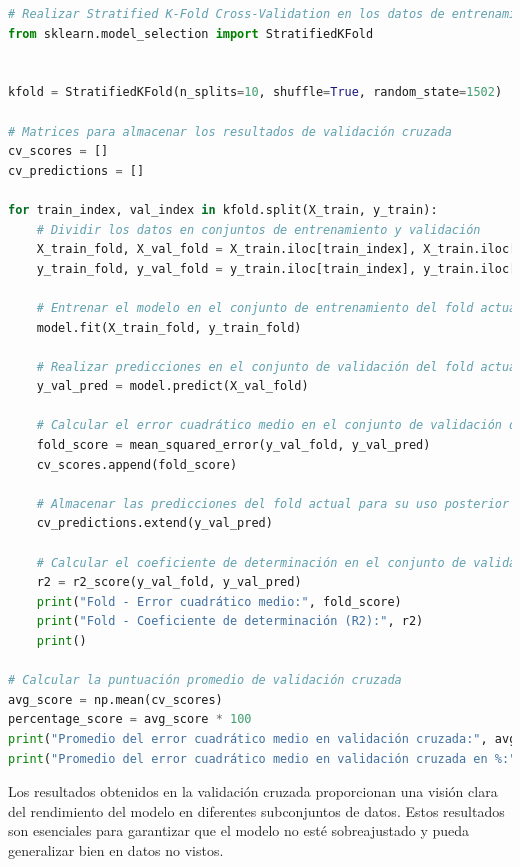 \begin{lstlisting}[language=Python, caption=Realizar Stratified K-Fold Cross-Validation en los datos de entrenamiento, label=lst:skfold_train]
# Realizar Stratified K-Fold Cross-Validation en los datos de entrenamiento
from sklearn.model_selection import StratifiedKFold


kfold = StratifiedKFold(n_splits=10, shuffle=True, random_state=1502)

# Matrices para almacenar los resultados de validación cruzada
cv_scores = []
cv_predictions = []

for train_index, val_index in kfold.split(X_train, y_train):
    # Dividir los datos en conjuntos de entrenamiento y validación
    X_train_fold, X_val_fold = X_train.iloc[train_index], X_train.iloc[val_index]
    y_train_fold, y_val_fold = y_train.iloc[train_index], y_train.iloc[val_index]
    
    # Entrenar el modelo en el conjunto de entrenamiento del fold actual
    model.fit(X_train_fold, y_train_fold)

    # Realizar predicciones en el conjunto de validación del fold actual
    y_val_pred = model.predict(X_val_fold)

    # Calcular el error cuadrático medio en el conjunto de validación del fold actual
    fold_score = mean_squared_error(y_val_fold, y_val_pred)
    cv_scores.append(fold_score)

    # Almacenar las predicciones del fold actual para su uso posterior
    cv_predictions.extend(y_val_pred)

    # Calcular el coeficiente de determinación en el conjunto de validación del fold actual
    r2 = r2_score(y_val_fold, y_val_pred)
    print("Fold - Error cuadrático medio:", fold_score)
    print("Fold - Coeficiente de determinación (R2):", r2)
    print()

# Calcular la puntuación promedio de validación cruzada
avg_score = np.mean(cv_scores)
percentage_score = avg_score * 100
print("Promedio del error cuadrático medio en validación cruzada:", avg_score)
print("Promedio del error cuadrático medio en validación cruzada en %:", percentage_score)
\end{lstlisting}


Los resultados obtenidos en la validación cruzada proporcionan una visión clara del rendimiento del modelo en diferentes subconjuntos de datos. Estos resultados son esenciales para garantizar que el modelo no esté sobreajustado y pueda generalizar bien en datos no vistos.

